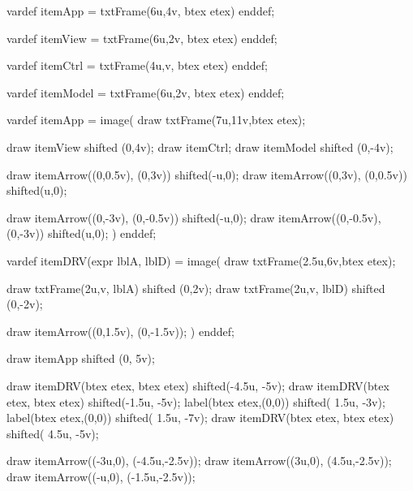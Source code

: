



vardef itemApp =
	txtFrame(6u,4v, btex  etex)
enddef;

vardef itemView =
	txtFrame(6u,2v, btex  etex)
enddef;

vardef itemCtrl =
	txtFrame(4u,v, btex  etex)
enddef;

vardef itemModel =
	txtFrame(6u,2v, btex  etex)
enddef;

vardef itemApp =
image(
	draw txtFrame(7u,11v,btex \mplabel{} etex);

	draw itemView shifted (0,4v);
	draw itemCtrl;
	draw itemModel shifted (0,-4v);

	draw itemArrow((0,0.5v), (0,3v)) shifted(-u,0);
	draw itemArrow((0,3v), (0,0.5v)) shifted(u,0);

	draw itemArrow((0,-3v), (0,-0.5v)) shifted(-u,0);
	draw itemArrow((0,-0.5v), (0,-3v)) shifted(u,0);
)
enddef;

vardef itemDRV(expr lblA, lblD) =
image(
	draw txtFrame(2.5u,6v,btex \mplabel{} etex);

	draw txtFrame(2u,v, lblA) shifted (0,2v);
	draw txtFrame(2u,v, lblD) shifted (0,-2v);

	draw itemArrow((0,1.5v), (0,-1.5v));
)
enddef;

draw itemApp shifted (0, 5v);

draw itemDRV(btex  etex, btex  etex) shifted(-4.5u, -5v);
draw itemDRV(btex  etex, btex  etex) shifted(-1.5u, -5v);
label(btex \mplabel{\cdots} etex,(0,0))                               shifted( 1.5u, -3v);
label(btex \mplabel{\cdots} etex,(0,0))                               shifted( 1.5u, -7v);
draw itemDRV(btex  etex, btex  etex) shifted( 4.5u, -5v);


draw itemArrow((-3u,0), (-4.5u,-2.5v));
draw itemArrow((3u,0), (4.5u,-2.5v));
draw itemArrow((-u,0), (-1.5u,-2.5v));

\stopreusableMPgraphic

